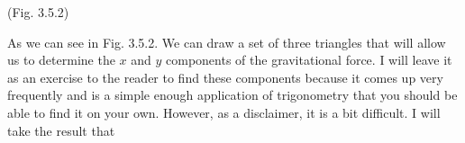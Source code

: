 \documentclass{article}[gray]
\numberwithin{equation}{subsection}
\begin{document}
\newline
\newline
\newline
{}
\begin{center} 
(Fig. 3.5.2)
\end{center}
As we can see in Fig. 3.5.2. We can draw a set of three triangles that will allow us to determine the $x$ and  $y$ components of the gravitational force. I will leave it as an exercise to the reader to find these components because it comes up very frequently and is a simple enough application of trigonometry that you should be able to find it on your own. However, as a disclaimer, it is a bit difficult. I will take the result that
\end{document}
